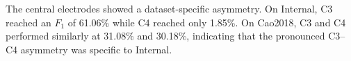 The central electrodes showed a dataset-specific asymmetry. On Internal, C3 reached an $F_1$ of 61.06\% while C4 reached only 1.85\%. On Cao2018, C3 and C4 performed similarly at 31.08\% and 30.18\%, indicating that the pronounced C3--C4 asymmetry was specific to Internal.
